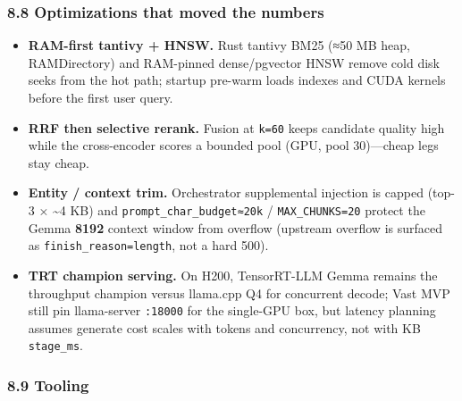 \documentclass[
  11pt,
]{article}
\providecommand{\tightlist}{%
  \setlength{\itemsep}{0pt}\setlength{\parskip}{0pt}}
\begin{document}
\subsubsection{8.8 Optimizations that moved the
numbers}\label{optimizations-that-moved-the-numbers}

\begin{itemize}
\tightlist
\item
  \textbf{RAM-first tantivy + HNSW.} Rust tantivy BM25 (≈50 MB heap,
  RAMDirectory) and RAM-pinned dense/pgvector HNSW remove cold disk
  seeks from the hot path; startup pre-warm loads indexes and CUDA
  kernels before the first user query.
\item
  \textbf{RRF then selective rerank.} Fusion at \texttt{k=60} keeps
  candidate quality high while the cross-encoder scores a bounded pool
  (GPU, pool 30)---cheap legs stay cheap.
\item
  \textbf{Entity / context trim.} Orchestrator supplemental injection is
  capped (top-3 × \textasciitilde4 KB) and
  \texttt{prompt\_char\_budget≈20k} / \texttt{MAX\_CHUNKS=20} protect
  the Gemma \textbf{8192} context window from overflow (upstream
  overflow is surfaced as \texttt{finish\_reason=length}, not a hard
  500).
\item
  \textbf{TRT champion serving.} On H200, TensorRT-LLM Gemma remains the
  throughput champion versus llama.cpp Q4 for concurrent decode; Vast
  MVP still pin llama-server \texttt{:18000} for the single-GPU box, but
  latency planning assumes generate cost scales with tokens and
  concurrency, not with KB \texttt{stage\_ms}.
\end{itemize}

\subsubsection{8.9 Tooling}\label{tooling-4}
\end{document}
